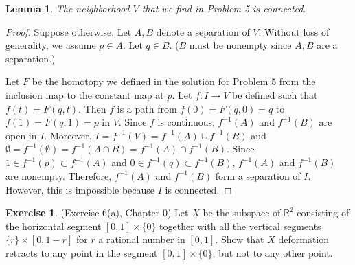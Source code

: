 \documentclass[12pt, psamsfonts]{amsart}
\newtheorem{lem}[thm]{Lemma}
\theoremstyle{definition}
\newtheorem{exer}[thm]{Exercise}
\theoremstyle{remark}
\numberwithin{equation}{section}
\begin{document}
\begin{lem}
  The neighborhood $V$ that we find in Problem 5 is connected.
\end{lem}

\begin{proof}
  Suppose otherwise.
  Let $A, B$ denote a separation of $V$.
  Without loss of generality, we assume $p \in A$.
  Let $q \in B$.
  ($B$ must be nonempty since $A, B$ are a separation.)

  Let $F$ be the homotopy we defined in the solution for Problem 5 from the inclusion map to the constant map at $p$.
  Let $f: I \rightarrow V$ be defined such that $f(t) = F(q, t)$.
  Then $f$ is a path from $f(0) = F(q, 0) = q$ to $f(1) = F(q, 1) = p$ in $V$.
  Since $f$ is continuous, $f^{-1}(A)$ and $f^{-1}(B)$ are open in $I$.
  Moreover, $I = f^{-1}(V) = f^{-1}(A) \cup f^{-1}(B)$ and $\emptyset = f^{-1}(\emptyset) = f^{-1}(A \cap B) = f^{-1}(A) \cap f^{-1}(B)$.
  Since $1 \in f^{-1}(p) \subset f^{-1}(A)$ and $0 \in f^{-1}(q) \subset f^{-1}(B)$, $f^{-1}(A)$ and $f^{-1}(B)$ are nonempty.
  Therefore, $f^{-1}(A)$ and $f^{-1}(B)$ form a separation of $I$.
  However, this is impossible because $I$ is connected.
\end{proof}

\begin{exer}{(Exercise 6(a), Chapter 0)}
  Let $X$ be the subspace of $\mathbb{R}^2$ consisting of the horizontal segment $[0, 1] \times \{ 0 \}$ together with all the vertical segments $\{ r \} \times [0, 1 - r]$ for $r$ a rational number in $[0, 1]$.
  Show that $X$ deformation retracts to any point in the segment $[0, 1] \times \{ 0 \}$, but not to any other point.
\end{exer}
\end{document}
